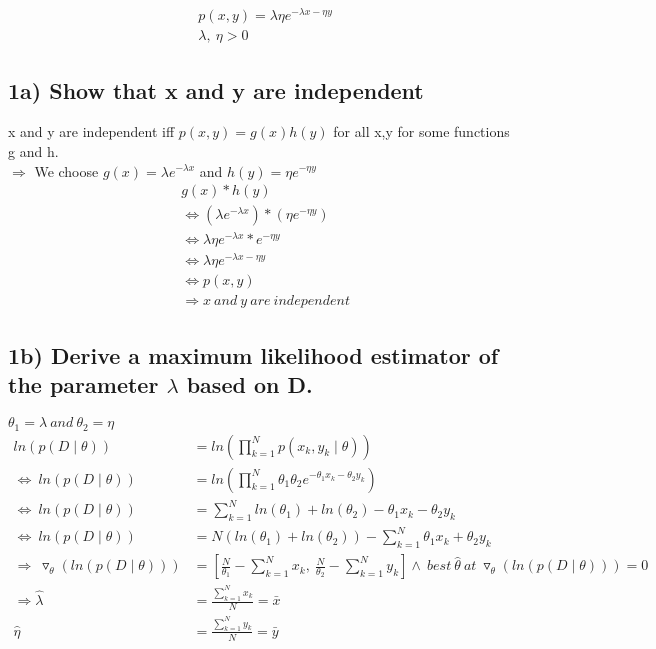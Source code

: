 \begin{align*}
    &p(x,y) = \lambda\eta e^{-\lambda x-\eta y}\\
    &\lambda,\ \eta>0
\end{align*}

\subsection*{1a) Show that x and y are independent}
x and y are independent iff $p(x,y)=g(x)h(y)$ for all x,y for some functions g and h.\\
$\Rightarrow$ We choose $g(x)=\lambda e^{-\lambda x}$ and $h(y)=\eta e^{-\eta y}$
\begin{align*}
    &g(x)*h(y)\\
    &\Leftrightarrow(\lambda e^{-\lambda x})*(\eta e^{-\eta y})\\
    &\Leftrightarrow\lambda\eta e^{-\lambda x}* e^{-\eta y}\\
    &\Leftrightarrow\lambda\eta e^{-\lambda x-\eta y}\\
    &\Leftrightarrow p(x,y)\\
    &\Rightarrow {x\ and\ y\ are\ independent}
\end{align*}

\subsection*{1b) Derive a maximum likelihood estimator of the parameter $\lambda$ based on D.}
$\theta_1=\lambda\ and\ \theta_2=\eta$ \\
\begin{align*}
ln(p(D\mid\theta))&=ln(\prod_{k=1}^N p(x_k, y_k\mid \theta))\\
\Leftrightarrow\ ln(p(D\mid\theta))&=ln(\prod_{k=1}^N \theta_1\theta_2 e^{-\theta_1 x_k-\theta_2 y_k})\\
\Leftrightarrow\ ln(p(D\mid\theta))&=\sum_{k=1}^N ln(\theta_1)+ln(\theta_2)-\theta_1 x_k-\theta_2 y_k\\
\Leftrightarrow\ ln(p(D\mid\theta))&=N(ln(\theta_1)+ln(\theta_2))-\sum_{k=1}^N \theta_1 x_k+\theta_2 y_k\\
\Rightarrow\ \triangledown_\theta(ln(p(D\mid\theta)))&=\left[\frac{N}{\theta_1}-\sum_{k=1}^N x_k,\ \frac{N}{\theta_2}-\sum_{k=1}^N y_k\right] \land\ best\ \hat{\theta}\ at\  \triangledown_\theta(ln(p(D\mid\theta)))=0\\
\Rightarrow \hat{\lambda}&=\frac{\sum_{k=1}^N x_k}{N}=\bar{x}\\
\hat{\eta}&=\frac{\sum_{k=1}^N y_k}{N}=\bar{y}
\end{align*}


